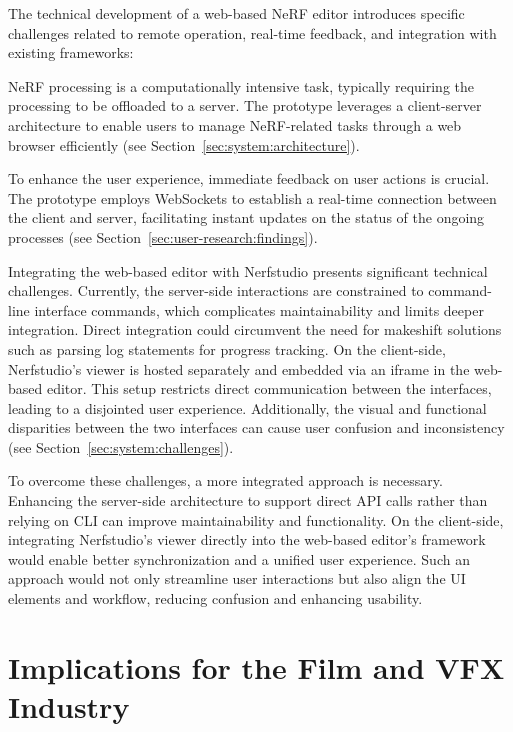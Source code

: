 The technical development of a web-based NeRF editor introduces specific challenges related to remote operation, real-time feedback, and integration with existing frameworks:

 NeRF processing is a computationally intensive task, typically requiring the processing to be offloaded to a server.
The prototype leverages a client-server architecture to enable users to manage NeRF-related tasks through a web browser efficiently (see Section~\ref{sec:system:architecture}).
 
 To enhance the user experience, immediate feedback on user actions is crucial.
The prototype employs WebSockets to establish a real-time connection between the client and server, facilitating instant updates on the status of the ongoing processes (see Section~\ref{sec:user-research:findings}).
 
 Integrating the web-based editor with Nerfstudio presents significant technical challenges.
Currently, the server-side interactions are constrained to command-line interface commands, which complicates maintainability and limits deeper integration.
Direct integration could circumvent the need for makeshift solutions such as parsing log statements for progress tracking.
On the client-side, Nerfstudio's viewer is hosted separately and embedded via an iframe in the web-based editor.
This setup restricts direct communication between the interfaces, leading to a disjointed user experience.
Additionally, the visual and functional disparities between the two interfaces can cause user confusion and inconsistency (see Section~\ref{sec:system:challenges}).

To overcome these challenges, a more integrated approach is necessary.
Enhancing the server-side architecture to support direct API calls rather than relying on CLI can improve maintainability and functionality.
On the client-side, integrating Nerfstudio's viewer directly into the web-based editor's framework would enable better synchronization and a unified user experience.
Such an approach would not only streamline user interactions but also align the UI elements and workflow, reducing confusion and enhancing usability.


\section{Implications for the Film and VFX Industry}
\label{sec:discussion:implications}

